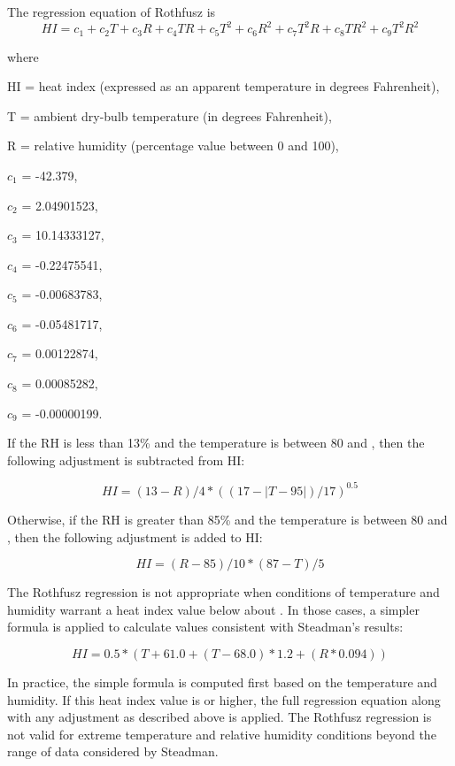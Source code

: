 The regression equation of Rothfusz is
\begin{equation}  \label{eq:rm-1}
HI = c_1 + c_2T + c_3R + c_4TR + c_5T^2 + c_6R^2 + c_7T^2R + c_8TR^2 + c_9T^2R^2
\end{equation}

where

HI = heat index (expressed as an apparent temperature in degrees Fahrenheit),

T = ambient dry-bulb temperature (in degrees Fahrenheit),

R = relative humidity (percentage value between 0 and 100),

$c_1$ = -42.379,

$c_2$ = 2.04901523,

$c_3$ = 10.14333127,

$c_4$ = -0.22475541,

$c_5$ = -0.00683783,

$c_6$ = -0.05481717,

$c_7$ = 0.00122874,

$c_8$ = 0.00085282,

$c_9$ = -0.00000199.

If the RH is less than 13\% and the temperature is between 80 and , then
the following adjustment is subtracted from HI:

\begin{equation}  \label{eq:rm-2}
HI = (13 - R) / 4 * ((17 - |T - 95|) / 17)^{0.5}
\end{equation}

Otherwise, if the RH is greater than 85\% and the temperature is between 80 and
, then the following adjustment is added to HI:

\begin{equation}  \label{eq:rm-3}
HI = (R - 85) / 10 * (87 - T) / 5
\end{equation}

The Rothfusz regression is not appropriate when conditions of temperature and
humidity warrant a heat index value below about . In those cases, a simpler
formula is applied to calculate values consistent with Steadman's results:

\begin{equation}  \label{eq:rm-4}
HI = 0.5 * (T + 61.0 + (T - 68.0) * 1.2 + (R * 0.094))
\end{equation}

In practice, the simple formula is computed first based on the temperature and
humidity. If this heat index value is  or higher, the full regression
equation along with any adjustment as described above is applied. The Rothfusz
regression is not valid for extreme temperature and relative humidity conditions
beyond the range of data considered by Steadman.

